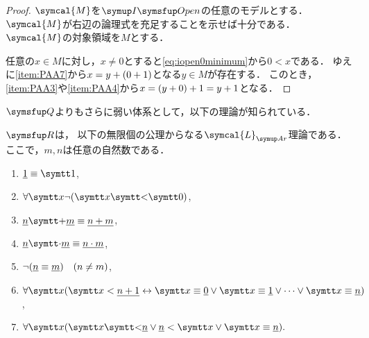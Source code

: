 \begin{proof}
	\(\symcal{M}\)を\(\OpenFormulaInduction\)の任意のモデルとする．\(\symcal{M}\)が右辺の論理式を充足することを示せば十分である．
	\(\symcal{M}\)の対象領域を\(M\)とする．

	任意の\(x \in M\)に対し，\(x \neq 0\)とすると\cref{eq:iopen0minimum}から\(0 < x\)である．
	ゆえに\cref{item:PAA7}から\(x = y + \paren{0 + 1}\)となる\(y \in M\)が存在する．
	このとき，\cref{item:PAA3}や\cref{item:PAA4}から\(x = \paren{y + 0} + 1 = y + 1\)となる．
\end{proof}


\(\Robinson\)よりもさらに弱い体系として，以下の理論が知られている．

\begin{Def} \label{Def:RArithmetic}
	\(\RArithmetic\)は，
	以下の無限個の公理からなる\(\symcal{L}_{\Ar}\)理論である．
	ここで，\(m, n\)は任意の自然数である．

	\begin{enumerate}[label=R\arabic*.,ref=R\arabic*]
		\item \label{item:RR1} \(\numeral{1} \objeq \obj{1}\),
		\item \label{item:RR2} \(\forall \obj{x} \lnot \paren{\obj{x} \obj{<} \obj{0}}\),
		\item \label{item:RR3} \(\numeral{n} \obj{+} \numeral{m} \objeq \numeral{n + m}\),
		\item \label{item:RR4} \(\numeral{n} \obj{\cdot} \numeral{m} \objeq \numeral{n \cdot m}\),
		\item \label{item:RR5} \(\lnot \paren{\numeral{n} \objeq \numeral{m}} \quad (n \neq m)\),
		\item \label{item:RR6} \(\forall \obj{x} \paren{\obj{x} < \numeral{n + 1} \formulaequiv \obj{x} \objeq \numeral{0} \lor \obj{x} \objeq \numeral{1} \lor \dotsb \lor \obj{x} \objeq \numeral{n}}\),
		\item \label{item:RR7} \(\forall \obj{x} \paren{\obj{x} \obj{<} \numeral{n} \lor \numeral{n} < \obj{x} \lor \obj{x} \objeq \numeral{n}}.\)
	\end{enumerate}
\end{Def}




